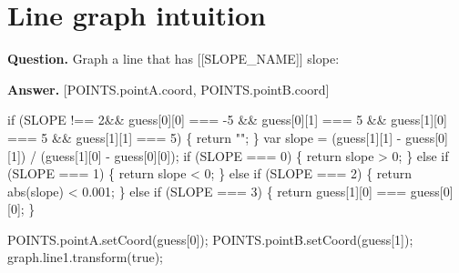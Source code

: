 \documentclass{article}
\begin{document}
\section*{Line graph intuition}
\textbf{Question.} Graph a line that has [[SLOPE\_NAME]] slope:

\textbf{Answer.} [POINTS.pointA.coord, POINTS.pointB.coord]
                
                
                    if (SLOPE !== 2\&\&
                            guess[0][0] === -5 \&\&
                            guess[0][1] === 5 \&\&
                            guess[1][0] === 5 \&\&
                            guess[1][1] === 5) \{
                        return "";
                    \}
                    var slope = (guess[1][1] - guess[0][1]) /
                        (guess[1][0] - guess[0][0]);
                    if (SLOPE === 0) \{
                        return slope > 0;
                    \} else if (SLOPE === 1) \{
                        return slope < 0;
                    \} else if (SLOPE === 2) \{
                        return abs(slope) < 0.001;
                    \} else if (SLOPE === 3) \{
                        return guess[1][0] === guess[0][0];
                    \}
                
                
                    POINTS.pointA.setCoord(guess[0]);
                    POINTS.pointB.setCoord(guess[1]);
                    graph.line1.transform(true);
\end{document}
